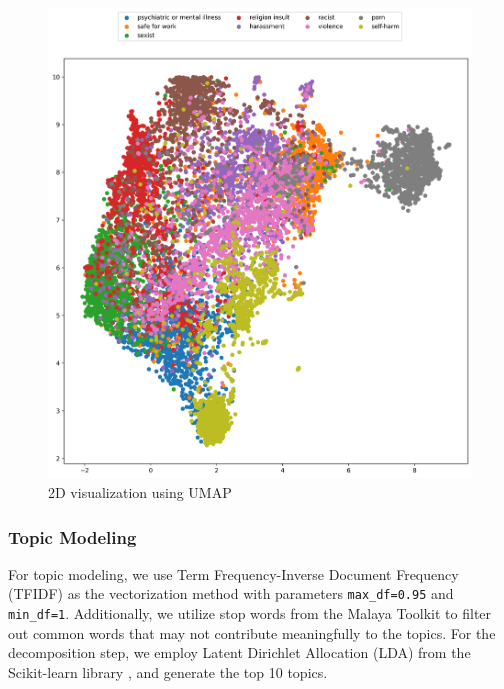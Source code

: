 \documentclass[preprint]{article}
\begin{document}
\begin{figure}[h]
  \centering
  \includegraphics[width=0.7\linewidth]{img/2d.png}
  \caption{2D visualization using UMAP}
\end{figure}

\subsubsection*{Topic Modeling}

For topic modeling, we use Term Frequency-Inverse Document Frequency (TFIDF) as the vectorization method with parameters \texttt{max\_df=0.95} and \texttt{min\_df=1}. Additionally, we utilize stop words from the Malaya Toolkit \cite{Malaya} to filter out common words that may not contribute meaningfully to the topics. For the decomposition step, we employ Latent Dirichlet Allocation (LDA) from the Scikit-learn library \cite{scikit-learn}, and generate the top 10 topics.
\end{document}
